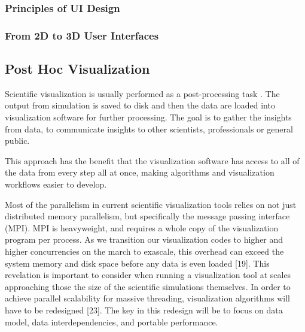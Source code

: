 \subsubsection{Principles of UI Design}

\subsubsection{From 2D to 3D User Interfaces}



\subsection{Post Hoc Visualization}

Scientific visualization is usually performed as a post-processing task \citep{kressSituVisualizationTechniques}. The output from simulation is saved to disk and then the data are loaded into visualization software for further processing. The goal is to gather the insights from data, 
to communicate insights to other scientists, professionals or general public. 

This approach has the benefit that the visualization software has access to all of the data from every step all at once, making algorithms and visualization workflows easier to develop.

Most of the parallelism in current scientific visualization tools relies on not just distributed memory parallelism, but specifically the message passing interface (MPI). MPI is heavyweight, and requires a whole copy of the visualization program per process. As we transition our visualization codes to higher and higher concurrencies on the march to exascale, this overhead can exceed the system memory and disk space before any data is even loaded [19]. This revelation is important to consider when running a visualization tool at scales approaching those the size of the scientific simulations themselves.
In order to achieve parallel scalability for massive threading, visualization algorithms will have to be redesigned [23]. The key in this redesign will be to focus on data model, data interdependencies, and portable performance.

